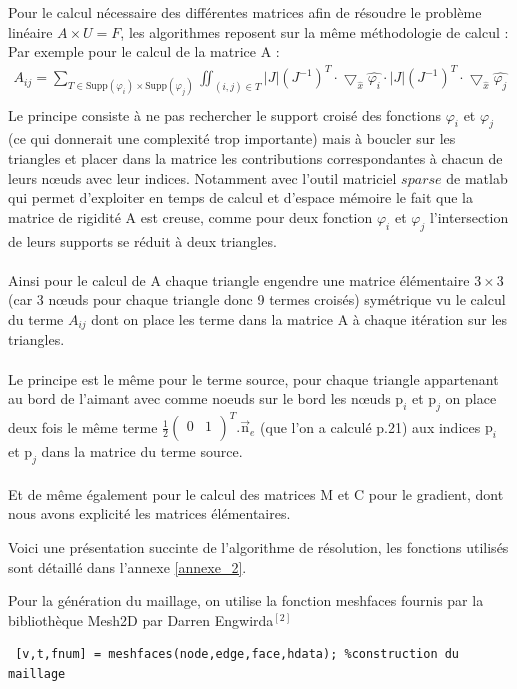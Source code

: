 \documentclass[a4paper,12pt,titlepage]{report}
\begin{document}
\begin{onehalfspace}
Pour le calcul nécessaire des différentes matrices afin de résoudre le problème linéaire $A\times U = F$, les algorithmes reposent sur la même méthodologie de calcul :
Par exemple pour le calcul de la matrice A : 
\[
\begin{aligned}
A_{ij} = 
	\sum_{T \in \text{Supp}(\varphi_{i})\times \text{Supp}(\varphi_{j})}
	\iint_{(i,j) \in T} |J|(J^{-1})^{T}
	\cdot
	\bigtriangledown_{\hat{x}} \hat{\varphi_{i}} \cdot
	|J| (J^{-1})^{T} 
	\cdot
	\bigtriangledown_{\hat{x}} \hat{\varphi_{j}} \\
\end{aligned}
\]
Le principe consiste à ne pas rechercher le support croisé des fonctions $\varphi_i$ et $\varphi_j$ (ce qui donnerait une complexité trop importante) mais à boucler sur les triangles et placer dans la matrice les contributions correspondantes à chacun de leurs nœuds avec leur indices. Notamment avec l'outil matriciel $sparse$ de matlab qui permet d'exploiter en temps de calcul et d'espace mémoire le fait que la matrice de rigidité A est creuse, comme pour deux fonction $\varphi_{i}$ et $\varphi_{j}$ l'intersection de leurs supports se réduit à deux triangles.
\\
\\
Ainsi pour le calcul de A chaque triangle engendre une matrice élémentaire $ 3\times 3$ (car 3 nœuds pour chaque triangle donc 9 termes croisés) symétrique vu le calcul du terme $A_{ij}$ dont on place les terme dans la matrice A à chaque itération sur les triangles.
\\
\\Le principe est le même pour le terme source, pour chaque triangle appartenant au bord de l'aimant avec comme noeuds sur le bord les nœuds $\text{p}_{i}$ et  $\text{p}_{j}$ on place deux fois le même terme $\frac{1}{2}\begin{pmatrix} 
   									0 & 1\\
								\end{pmatrix}^{T}.
								\vec{\text{n}}_{e}$ 
(que l'on a calculé p.21) aux indices $\text{p}_{i}$ et  $\text{p}_{j}$ dans la matrice du terme source.
\\
\\
Et de même également pour le calcul des matrices M et C pour le gradient, dont nous avons explicité les matrices élémentaires.	

Voici une présentation succinte de l'algorithme de résolution, les fonctions utilisés sont détaillé dans l'annexe \ref{annexe_2}.

Pour la génération du maillage, on utilise la fonction meshfaces fournis par la bibliothèque Mesh2D par Darren Engwirda$^{[2]}$
\begin{verbatim}
 [v,t,fnum] = meshfaces(node,edge,face,hdata); %construction du maillage
 

\end{verbatim}
\end{onehalfspace}
\end{document}
